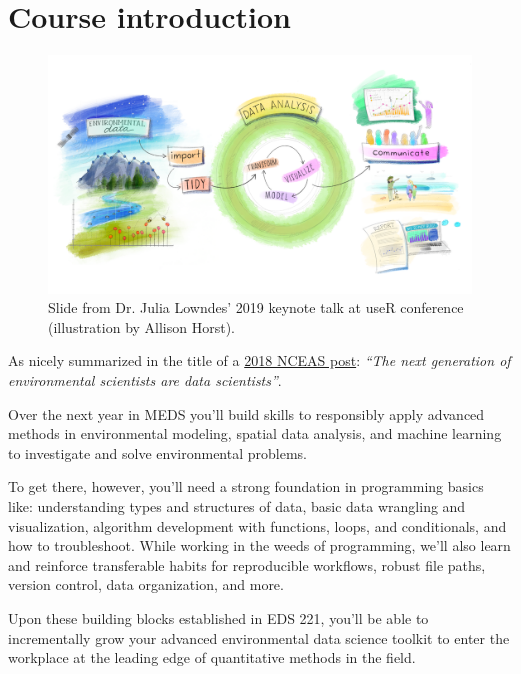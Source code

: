 \documentclass[
]{book}
\begin{document}
\hypertarget{course-introduction}{%
\section{Course introduction}\label{course-introduction}}

\begin{figure}

{\centering \includegraphics[width=1\linewidth]{images/eds_r4ds} 

}

\caption{Slide from Dr. Julia Lowndes' 2019 keynote talk at useR conference (illustration by Allison Horst).}\label{fig:unnamed-chunk-2}
\end{figure}

As nicely summarized in the title of a \href{https://www.nceas.ucsb.edu/news/next-generation-environmental-scientists-are-data-scientists}{2018 NCEAS post}: \emph{``The next generation of environmental scientists are data scientists''}.

Over the next year in MEDS you'll build skills to responsibly apply advanced methods in environmental modeling, spatial data analysis, and machine learning to investigate and solve environmental problems.

To get there, however, you'll need a strong foundation in programming basics like: understanding types and structures of data, basic data wrangling and visualization, algorithm development with functions, loops, and conditionals, and how to troubleshoot. While working in the weeds of programming, we'll also learn and reinforce transferable habits for reproducible workflows, robust file paths, version control, data organization, and more.

Upon these building blocks established in EDS 221, you'll be able to incrementally grow your advanced environmental data science toolkit to enter the workplace at the leading edge of quantitative methods in the field.
\end{document}
